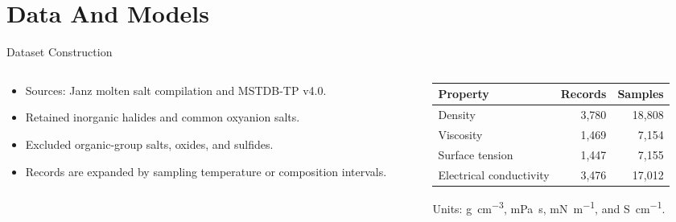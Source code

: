 \documentclass[aspectratio=169,10pt]{beamer}
\begin{document}
\section{Data And Models}

\begin{frame}{Dataset Construction}
  \begin{columns}[T,onlytextwidth]
    \begin{column}{0.50\textwidth}
      \begin{itemize}
        \item Sources: Janz molten salt compilation and MSTDB-TP v4.0.
        \item Retained inorganic halides and common oxyanion salts.
        \item Excluded organic-group salts, oxides, and sulfides.
        \item Records are expanded by sampling temperature or composition intervals.
      \end{itemize}
    \end{column}
    \begin{column}{0.46\textwidth}
      \footnotesize
      \begin{tabular}{lrr}
        \toprule
        Property & Records & Samples \\
        \midrule
        Density & 3,780 & 18,808 \\
        Viscosity & 1,469 & 7,154 \\
        Surface tension & 1,447 & 7,155 \\
        Electrical conductivity & 3,476 & 17,012 \\
        \bottomrule
      \end{tabular}

      \vspace{0.4cm}
      Units: \si{g.cm^{-3}}, \si{mPa.s}, \si{mN.m^{-1}}, and \si{S.cm^{-1}}.
    \end{column}
  \end{columns}
\end{frame}
\end{document}
